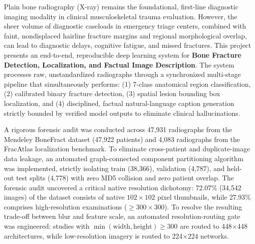 \documentclass[12pt, a4paper]{report}
\begin{document}
Plain bone radiography (X-ray) remains the foundational, first-line diagnostic imaging modality in clinical musculoskeletal trauma evaluation. However, the sheer volume of diagnostic caseloads in emergency triage centers, combined with faint, nondisplaced hairline fracture margins and regional morphological overlap, can lead to diagnostic delays, cognitive fatigue, and missed fractures. This project presents an end-to-end, reproducible deep learning system for \textbf{Bone Fracture Detection, Localization, and Factual Image Description}. The system processes raw, unstandardized radiographs through a synchronized multi-stage pipeline that simultaneously performs: (1) 7-class anatomical region classification, (2) calibrated binary fracture detection, (3) spatial lesion bounding box localization, and (4) disciplined, factual natural-language caption generation strictly bounded by verified model outputs to eliminate clinical hallucinations.

A rigorous forensic audit was conducted across 47,931 radiographs from the Mendeley BoneFract dataset (47,922 patients) and 4,083 radiographs from the FracAtlas localization benchmark. To eliminate cross-patient and duplicate-image data leakage, an automated graph-connected component partitioning algorithm was implemented, strictly isolating train (38,366), validation (4,787), and held-out test splits (4,778) with zero MD5 collision and zero patient overlap. The forensic audit uncovered a critical native resolution dichotomy: 72.07\% (34,542 images) of the dataset consists of native $102\times 102$ pixel thumbnails, while 27.93\% comprises high-resolution examinations ($\ge 300\times 300$). To resolve the resulting trade-off between blur and feature scale, an automated resolution-routing gate was engineered: studies with $\min(\text{width}, \text{height}) \ge 300$ are routed to 448$\times$448 architectures, while low-resolution imagery is routed to 224$\times$224 networks.
\end{document}
